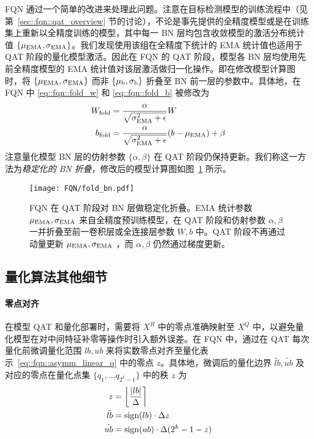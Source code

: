 FQN 通过一个简单的改进来处理此问题。注意在目标检测模型的训练流程中（见第~\ref{sec::fqn::qat_overview} 节的讨论），不论是事先提供的全精度模型或是在训练集上重新以全精度训练的模型，其中每一 BN 层均包含收敛模型的激活分布统计值 $\{{ \mu }_{\mathrm{EMA}}, { \sigma }_{\mathrm{EMA}}\}$。我们发现使用该组在全精度下统计的 EMA 统计值也适用于 QAT 阶段的量化模型激活。因此在 FQN 的 QAT 阶段，模型各 BN 层均使用先前全精度模型的 EMA 统计值对该层激活做归一化操作。即在修改模型计算图时，将 $\{{ \mu }_{\mathrm{EMA}}, { \sigma }_{\mathrm{EMA}}\}$ 而非 $\{{ \mu }_{\mathrm{b}}, { \sigma }_{\mathrm{b}}\}$ 折叠至 BN 前一层的参数中。具体地，在 FQN 中 \eqref{eq::fqn::fold_w} 和 \eqref{eq::fqn::fold_b} 被修改为
\begin{align}
  { W }_{\mathrm{fold}} &= \frac{\alpha}{\sqrt{{ \sigma }_{\mathrm{EMA}}^2 + \epsilon}} W \label{eq::fqn::fold_w_stable} \\
  { b }_{\mathrm{fold}} &= \frac{\alpha}{\sqrt{{ \sigma }_{\mathrm{EMA}}^2 + \epsilon}} (b - { \mu }_{\mathrm{EMA}}) + \beta \label{eq::fqn::fold_b_stable}
\end{align}
注意量化模型 BN 层的仿射参数 $\{\alpha, \beta\}$ 在 QAT 阶段仍保持更新。我们称这一方法为\emph{稳定化的 BN 折叠}，修改后的模型计算图如图~\ref{img::fqn::foldbn_stable} 所示。

\begin{figure}[htb]
  \centering
  \texttt{[image: FQN/fold\_bn.pdf]}
  \caption{FQN 在 QAT 阶段对 BN 层做稳定化折叠。EMA 统计参数 ${ \mu }_{\mathrm{EMA}}, { \sigma }_{\mathrm{EMA}}$ 来自全精度预训练模型，在 QAT 阶段和仿射参数 $\alpha, \beta$ 一并折叠至前一卷积层或全连接层参数 $W, b$ 中。QAT 阶段不再通过动量更新 ${ \mu }_{\mathrm{EMA}}, { \sigma }_{\mathrm{EMA}}$ ，而 $\alpha, \beta$ 仍然通过梯度更新。}
  \label{img::fqn::foldbn_stable}
\end{figure}
\subsection{量化算法其他细节} \label{sec::fqn::q_misc}
\paragraph{零点对齐}
在模型 QAT 和量化部署时，需要将 $X^R$ 中的零点准确映射至 $X^Q$ 中，以避免量化模型在对中间特征补零等操作时引入额外误差。在 FQN 中，通过在 QAT 每次量化前微调量化范围 $lb, ub$ 来将实数零点对齐至量化表示~\eqref{eq::fqn::asymm_linear_q} 中的零点 $z$。具体地，微调后的量化边界 $\tilde{lb}, \tilde{ub}$ 及对应的零点在量化点集 $\{q_1, \ldots q_{2^k-1}\}$ 中的秩 $z$ 为
\begin{align}
  z &= \left\lfloor \frac{|lb|}{\Delta} \right\rceil \\
  \tilde{lb} &= \operatorname{sign}(lb) \cdot \Delta z \\
  \tilde{ub} &= \operatorname{sign}(ub) \cdot \Delta (2^k - 1 - z)
\end{align}

